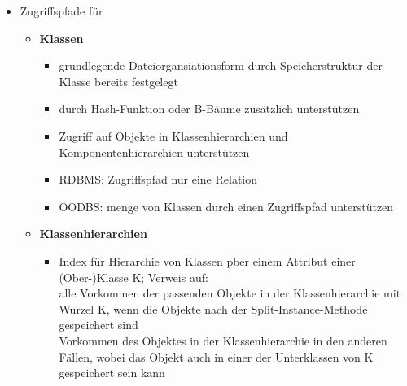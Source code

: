 \begin{itemize}
	\item Zugriffspfade für
	\begin{itemize}
		\item \textbf{Klassen}
		\begin{itemize}
			\item grundlegende Dateiorgansiationsform durch Speicherstruktur der Klasse bereits festgelegt
			\item durch Hash-Funktion oder B-Bäume zusätzlich unterstützen
			\item Zugriff auf Objekte in Klassenhierarchien und Komponentenhierarchien unterstützen
			\item RDBMS: Zugriffspfad nur eine Relation
			\item OODBS: menge von Klassen durch einen Zugriffspfad unterstützen
		\end{itemize}
		\item \textbf{Klassenhierarchien}
		\begin{itemize}
			\item Index für Hierarchie von Klassen pber einem Attribut einer (Ober-)Klasse K; Verweis auf:\\
			alle Vorkommen der passenden Objekte in der Klassenhierarchie mit Wurzel K, wenn die Objekte nach der Split-Instance-Methode gespeichert sind\\
			Vorkommen des Objektes in der Klassenhierarchie in den anderen Fällen, wobei das Objekt auch in einer der Unterklassen von K gespeichert sein kann
			

\end{itemize}
\end{itemize}
\end{itemize}
